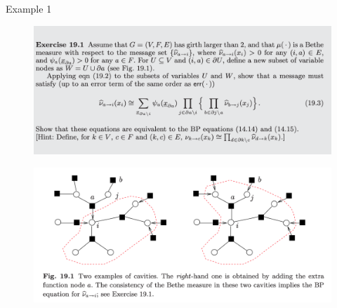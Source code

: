 \documentclass[UTF8]{beamer}
\begin{document}
\begin{frame}{Example 1}
  \begin{minipage}[c]{0.9\linewidth}
    \begin{figure}
      \centering
      \includegraphics[width=0.85\linewidth]{./fig/Exam_191.png}
    \end{figure}
  \end{minipage}
  \vfill
  \begin{minipage}[c]{0.9\linewidth}
    \begin{figure}
      \centering
      \includegraphics[width=0.8\linewidth]{./fig/FIG_191.png}
    \end{figure}
  \end{minipage}
\end{frame}
\end{document}
